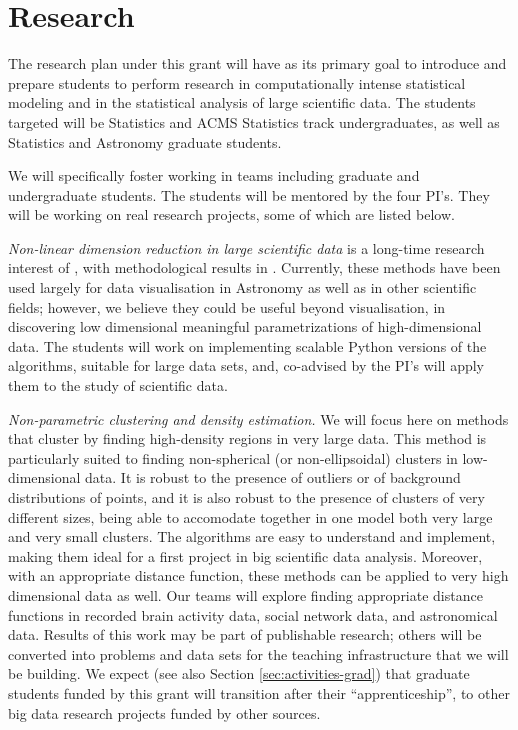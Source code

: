 \section{Research}
\label{sec:research}

The research plan under this grant will have as its primary goal to
introduce and prepare students to perform research in computationally
intense statistical modeling and in the statistical analysis of large
scientific data. The students targeted will be Statistics and ACMS
Statistics track undergraduates, as well as Statistics and Astronomy
graduate students. 

We will specifically foster working in teams including graduate and
undergraduate students. The students will be mentored by the four
PI's. They will be working on real research projects, some of which
are listed below. 
\bits
\item {\em Non-linear dimension reduction in large scientific data} is a long-time research interest of \meila, with methodological results in \cite{}. Currently, these methods have been used largely for data visualisation in Astronomy as well as in other scientific fields; however, we believe they could be useful beyond visualisation, in discovering low dimensional meaningful parametrizations of high-dimensional data. The students will work on implementing scalable Python versions of the algorithms, suitable for large data sets, and, co-advised by the PI's will apply them to the study of scientific data.
\item {\em Non-parametric clustering and density estimation.} We will
  focus here on methods that cluster by finding high-density regions
  in very large data. This method is particularly suited to finding
  non-spherical (or non-ellipsoidal) clusters in low-dimensional
  data. It is robust to the presence of outliers or of background
  distributions of points, and it is also robust to the presence of
  clusters of very different sizes, being able to accomodate together
  in one model both very large and very small clusters. The algorithms
  are easy to understand and implement, making them ideal for a first
  project in big scientific data analysis. Moreover, with an
  appropriate distance function, these methods can be applied to very
  high dimensional data as well. Our teams will explore finding
  appropriate distance functions in recorded brain activity data,
  social network data, and astronomical data.  
\eits
%
Results of this work may be part of publishable research; others will
be converted into problems and data sets for the teaching
infrastructure that we will be building. We expect (see also Section
\ref{sec:activities-grad}) that graduate students funded by this grant
will transition after their ``apprenticeship'', to other big data
research projects funded by other sources. 
